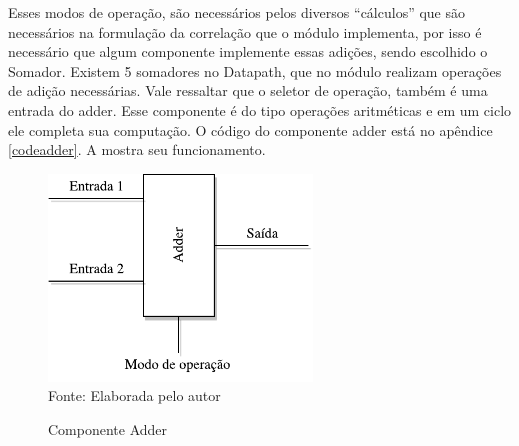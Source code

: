 Esses modos de operação, são necessários pelos diversos “cálculos” que são necessários na formulação da correlação que o módulo implementa, por isso  é necessário que algum componente implemente essas adições, sendo escolhido o Somador.
Existem 5 somadores no Datapath, que no módulo realizam operações de adição necessárias. Vale ressaltar que o seletor de operação, também é uma entrada do adder. Esse componente é do tipo operações aritméticas e em um ciclo ele completa sua computação. O código do componente adder está no apêndice \ref{codeadder}. A  mostra seu funcionamento.

\begin{figure}[H]
	\centering
	\caption{Componente Adder}
	\includegraphics[width=7cm]{figures/Adder.pdf}\\
	
	{Fonte: Elaborada pelo autor}
	\label{adder}
\end{figure}

